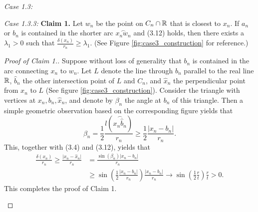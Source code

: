\documentclass[11pt]{amsart}
\numberwithin{equation}{section}
\theoremstyle{plain}
\theoremstyle{step}
\newenvironment{case}[1]{\par\noindent\textit{Case #1:}}{\par}
\def\leq{\leqslant}
\def\geq{\geqslant}
\newcommand{\abs}[1]{\lvert#1\rvert}
\newcommand{\R}{\Bbb{R}}
\newcommand{\arc}[1]{\overset{\frown}{#1}}
\begin{document}
\begin{case}{1.3}
\begin{case}{1.3.3}
\vspace{0.3cm}
\textbf{Claim 1.} Let $w_n$ be the point on $C_n\cap\R$ that is closest to $x_n$. If $a_n$ or $b_n$ is contained in the shorter arc $\arc{x_nw_n}$ and (3.12) holds, then there exists a $\lambda_1>0$ such that $\frac{\delta(x_n)}{r_n}\geq \lambda_1$. (See Figure \ref{fig:case3_construction} for reference.)
\begin{proof}[Proof of Claim 1.]
Suppose without loss of generality that $b_n$ is contained in the arc connecting $x_n$ to $w_n$. 
Let $L$ denote the line through $b_n$ parallel to the real line $\R$, $\hat{b}_n$ the other intersection point of $L$ and $C_n$, and $\hat{x}_n$ the perpendicular point from $x_n$ to $L$ (See figure \ref{fig:case3_construction}).  
Consider the triangle with vertices at $x_n,b_n,\hat{x}_n$, and denote by $\beta_n$ the angle at $b_n$ of this triangle. 
Then a simple geometric observation based on the corresponding figure yields that
\begin{equation}
\beta_n=\frac{1}{2}\frac{l(\arc{x_n\hat{b}_n})} {r_n}\geq\frac{1}{2}\frac{|x_n-b_n|}{r_n}.
\end{equation}
This, together with (3.4) and (3.12), yields that 
$$\begin{aligned}\frac{\delta(x_n)}{r_n}\geq\frac{\abs{x_n-\hat{x}_n}}{r_n}&=\frac{\sin(\beta_n)\abs{x_n-b_n}}{r_n}\\
&\geq\sin\left(\frac{1}{2}\frac{|x_n-b_n|}{r_n} \right)\frac{|x_n-b_n|}{r_n}
\rightarrow\sin\left(\frac{1}{2}\frac{r}{t} \right)\frac{r}{t}>0.
\end{aligned}$$
This completes the proof of Claim 1.
       
\begin{figure}[h]

\begin{tikzpicture}[x=0.75pt,y=0.75pt,yscale=-.8,xscale=.8]


\end{tikzpicture}
\end{figure}
\end{proof}
\end{case}
\end{case}
\end{document}
